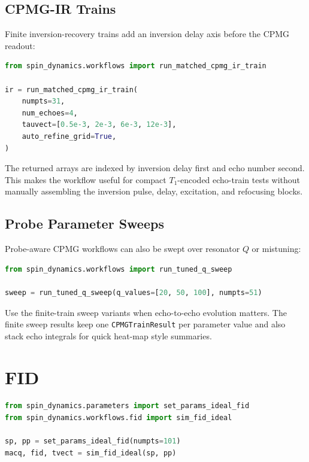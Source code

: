 \documentclass[11pt,oneside]{report}
\newcommand{\code}[1]{\texttt{#1}}
\begin{document}
\subsection{CPMG-IR Trains}

Finite inversion-recovery trains add an inversion delay axis before the CPMG
readout:

\begin{lstlisting}[language=Python]
from spin_dynamics.workflows import run_matched_cpmg_ir_train

ir = run_matched_cpmg_ir_train(
    numpts=31,
    num_echoes=4,
    tauvect=[0.5e-3, 2e-3, 6e-3, 12e-3],
    auto_refine_grid=True,
)
\end{lstlisting}

The returned arrays are indexed by inversion delay first and echo number
second. This makes the workflow useful for compact \(T_1\)-encoded echo-train
tests without manually assembling the inversion pulse, delay, excitation, and
refocusing blocks.

\subsection{Probe Parameter Sweeps}

Probe-aware CPMG workflows can also be swept over resonator \(Q\) or mistuning:

\begin{lstlisting}[language=Python]
from spin_dynamics.workflows import run_tuned_q_sweep

sweep = run_tuned_q_sweep(q_values=[20, 50, 100], numpts=51)
\end{lstlisting}

Use the finite-train sweep variants when echo-to-echo evolution matters. The
finite sweep results keep one \code{CPMGTrainResult} per parameter value and
also stack echo integrals for quick heat-map style summaries.

\section{FID}

\begin{lstlisting}[language=Python]
from spin_dynamics.parameters import set_params_ideal_fid
from spin_dynamics.workflows.fid import sim_fid_ideal

sp, pp = set_params_ideal_fid(numpts=101)
macq, fid, tvect = sim_fid_ideal(sp, pp)
\end{lstlisting}
\end{document}
